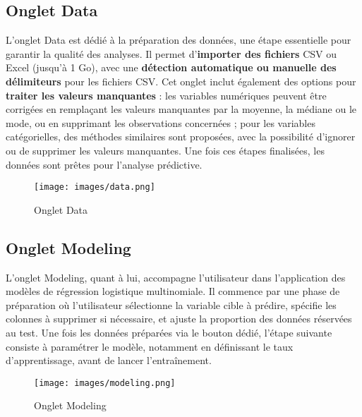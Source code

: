\documentclass{rapport}
\begin{document}
\subsection{Onglet Data}
L'onglet Data est dédié à la préparation des données, une étape essentielle pour garantir la qualité des analyses. Il permet d’\textbf{importer des fichiers } CSV ou Excel (jusqu’à 1 Go), avec une \textbf{détection automatique ou manuelle des délimiteurs} pour les fichiers CSV. Cet onglet inclut également des options pour \textbf{traiter les valeurs manquantes} : les variables numériques peuvent être corrigées en remplaçant les valeurs manquantes par la moyenne, la médiane ou le mode, ou en supprimant les observations concernées ; pour les variables catégorielles, des méthodes similaires sont proposées, avec la possibilité d’ignorer ou de supprimer les valeurs manquantes. Une fois ces étapes finalisées, les données sont prêtes pour l’analyse prédictive.

\begin{figure}[H]
    \centering
    \texttt{[image: images/data.png]}
    \caption{Onglet Data}
    \label{fig:onglet_data}
\end{figure}

\subsection{Onglet Modeling}
L’onglet Modeling, quant à lui, accompagne l’utilisateur dans l’application des modèles de régression logistique multinomiale. Il commence par une phase de préparation où l’utilisateur sélectionne la variable cible à prédire, spécifie les colonnes à supprimer si nécessaire, et ajuste la proportion des données réservées au test. Une fois les données préparées via le bouton dédié, l’étape suivante consiste à paramétrer le modèle, notamment en définissant le taux d’apprentissage, avant de lancer l’entraînement.

\begin{figure}[H]
    \centering
    \texttt{[image: images/modeling.png]}
    \caption{Onglet Modeling}
    \label{fig:onglet_modeling}
\end{figure}
\end{document}
